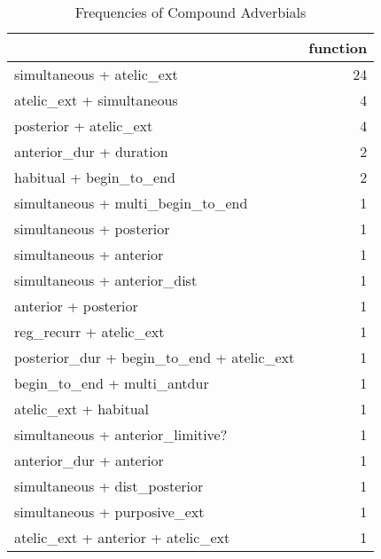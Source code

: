 \begin{table}[htbp!]
\centering
\caption{Frequencies of Compound Adverbials}
\label{table:multi_ct}
\begin{tabular}{lr}
\toprule
{} &  function \\
\midrule
simultaneous + atelic\_ext                 &        24 \\
atelic\_ext + simultaneous                 &         4 \\
posterior + atelic\_ext                    &         4 \\
anterior\_dur + duration                   &         2 \\
habitual + begin\_to\_end                   &         2 \\
simultaneous + multi\_begin\_to\_end         &         1 \\
simultaneous + posterior                  &         1 \\
simultaneous + anterior                   &         1 \\
simultaneous + anterior\_dist              &         1 \\
anterior + posterior                      &         1 \\
reg\_recurr + atelic\_ext                   &         1 \\
posterior\_dur + begin\_to\_end + atelic\_ext &         1 \\
begin\_to\_end + multi\_antdur               &         1 \\
atelic\_ext + habitual                     &         1 \\
simultaneous + anterior\_limitive?         &         1 \\
anterior\_dur + anterior                   &         1 \\
simultaneous + dist\_posterior             &         1 \\
simultaneous + purposive\_ext              &         1 \\
atelic\_ext + anterior + atelic\_ext        &         1 \\
\bottomrule
\end{tabular}
\end{table}
